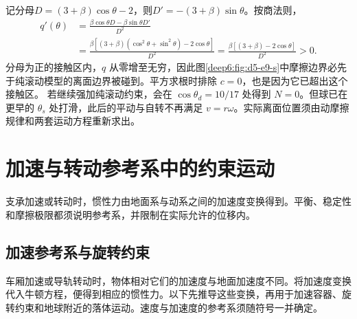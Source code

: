 \begin{solution}
记分母$D=(3+\beta)\cos\theta-2$，则$D'=-(3+\beta)\sin\theta$。按商法则，
\[
\begin{aligned}
q'(\theta)&=\frac{\beta\cos\theta D-\beta\sin\theta D'}{D^2}\\
&=\frac{\beta[(3+\beta)(\cos^2\theta+\sin^2\theta)-2\cos\theta]}{D^2}
=\frac{\beta[(3+\beta)-2\cos\theta]}{D^2}>0.
\end{aligned}
\]
分母为正的接触区内，$q$ 从零增至无穷，因此图\ref{deep6:fig:d5-e9-s}中摩擦边界必先于纯滚动模型的离面边界被碰到。平方求根时排除 $c=0$，也是因为它已超出这个接触区。
若继续强加纯滚动约束，会在 $\cos\theta_d=10/17$ 处得到 $N=0$。但球已在更早的 $\theta_s$ 处打滑，此后的平动与自转不再满足 $v=r\omega$。实际离面位置须由动摩擦规律和两套运动方程重新求出。
\end{solution}



\section{加速与转动参考系中的约束运动}

支承加速或转动时，惯性力由地面系与动系之间的加速度变换得到。平衡、稳定性和摩擦极限都须说明参考系，并限制在实际允许的位移内。



\subsection{加速参考系与旋转约束}
车厢加速或导轨转动时，物体相对它们的加速度与地面加速度不同。将加速度变换代入牛顿方程，便得到相应的惯性力。以下先推导这些变换，再用于加速容器、旋转约束和地球附近的落体运动。速度与加速度的参考系须随符号一并确定。

